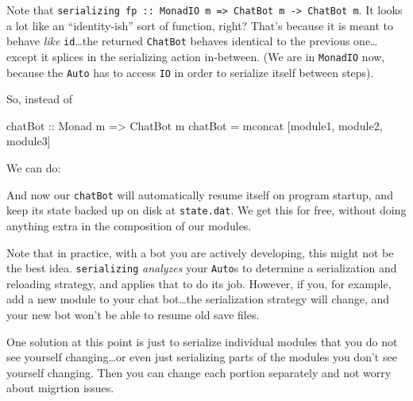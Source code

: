 \documentclass[]{article}
\newenvironment{Shaded}{}{}
\newcommand{\DataTypeTok}[1]{\textcolor[rgb]{0.56,0.13,0.00}{{#1}}}
\newcommand{\StringTok}[1]{\textcolor[rgb]{0.25,0.44,0.63}{{#1}}}
\newcommand{\OtherTok}[1]{\textcolor[rgb]{0.00,0.44,0.13}{{#1}}}
\newcommand{\FunctionTok}[1]{\textcolor[rgb]{0.02,0.16,0.49}{{#1}}}
\newcommand{\NormalTok}[1]{{#1}}
\begin{document}
Note that
\texttt{serializing\textquotesingle{}\ fp\ ::\ MonadIO\ m\ =\textgreater{}\ ChatBot\ m\ -\textgreater{}\ ChatBot\ m}.
It looks a lot like an ``identity-ish'' sort of function, right? That's because it is meant to
behave \emph{like} \texttt{id}\ldots{}the returned \texttt{ChatBot} behaves identical to the
previous one\ldots{}except it splices in the serializing action in-between. (We are in
\texttt{MonadIO} now, because the \texttt{Auto} has to access \texttt{IO} in order to serialize
itself between steps).

So, instead of

\begin{Shaded}
\begin{Highlighting}[]
\OtherTok{chatBot ::} \DataTypeTok{Monad} \NormalTok{m }\OtherTok{=>} \DataTypeTok{ChatBot} \NormalTok{m}
\NormalTok{chatBot }\FunctionTok{=} \NormalTok{mconcat [module1, module2, module3]}
\end{Highlighting}
\end{Shaded}

We can do:

\begin{Shaded}
\end{Shaded}

And now our \texttt{chatBot} will automatically resume itself on program startup, and keep its state
backed up on disk at \texttt{state.dat}. We get this for free, without doing anything extra in the
composition of our modules.

Note that in practice, with a bot you are actively developing, this might not be the best idea.
\texttt{serializing\textquotesingle{}} \emph{analyzes} your \texttt{Auto}s to determine a
serialization and reloading strategy, and applies that to do its job. However, if you, for example,
add a new module to your chat bot\ldots{}the serialization strategy will change, and your new bot
won't be able to resume old save files.

One solution at this point is just to serialize individual modules that you do not see yourself
changing\ldots{}or even just serializing parts of the modules you don't see yourself changing. Then
you can change each portion separately and not worry about migrtion issues.
\end{document}
